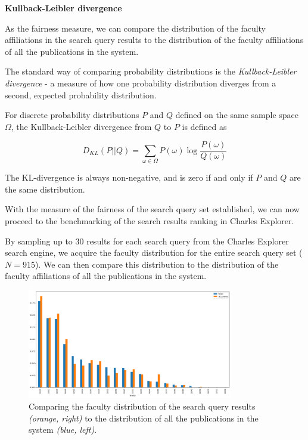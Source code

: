 \textbf{Kullback-Leibler divergence}

As the fairness measure, we can compare the distribution of the faculty affiliations in the search query results 
to the distribution of the faculty affiliations of all the publications in the system.

The standard way of comparing probability distributions is the \textit{Kullback-Leibler divergence} - a measure of how one probability distribution diverges from a second, expected probability distribution.

For discrete probability distributions $P$ and $Q$ defined on the same sample space $\Omega$, the Kullback-Leibler divergence from $Q$ to $P$ is defined as

$$
D_{KL}(P||Q) = \sum_{\omega \in \Omega} P(\omega) \log \frac{P(\omega)}{Q(\omega)}
$$

The KL-divergence is always non-negative, and is zero if and only if $P$ and $Q$ are the same distribution.

With the measure of the fairness of the search query set established, we can now proceed to the benchmarking of the search results ranking in Charles Explorer.

By sampling up to 30 results for each search query from the Charles Explorer search engine, we acquire the faculty distribution for the entire search query set ($N = 915$).
We can then compare this distribution to the distribution of the faculty affiliations of all the publications in the system.

\begin{figure}[ht!]
    \captionsetup{width=.9\linewidth}
    \includegraphics[width=0.8\textwidth]{../img/all-queries-vs-totals.png}
    \centering
    \caption{Comparing the faculty distribution of the search query results \textit{(orange, right)} to the distribution of all the publications in the system \textit{(blue, left)}.}
\end{figure}

